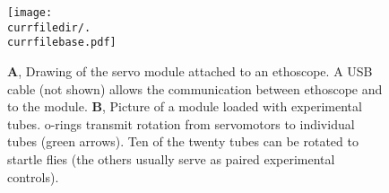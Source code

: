 \begin{figure}[h!]
  \centering   
   \texttt{[image: \\currfiledir/.\\currfilebase.pdf]}
  \caption[The servo module]{
  	\textbf{A}, Drawing of the servo module attached to an ethoscope. 
  	A USB cable (not shown) allows the communication between ethoscope and to the module.
  	\textbf{B}, Picture of a module loaded with experimental tubes. 
  	o-rings transmit rotation from servomotors to individual tubes (green arrows).
  	Ten of the twenty tubes can be rotated to startle flies (the others usually serve as paired experimental controls).
  \label{fig:\currfilebase}
  }
\end{figure}





